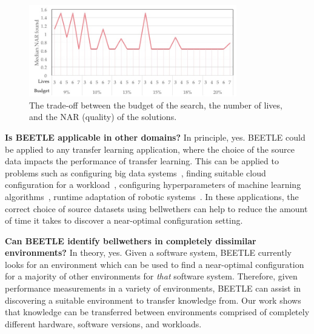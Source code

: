 \documentclass[10pt,journal,compsoc]{IEEEtran}
\begin{document}



\begin{figure}[t]
    \centering
    \includegraphics[width=0.98\linewidth, height=4cm]{figures/ParamTuning.jpg}
    \caption{The trade-off between the budget of the search, the number of lives, and the NAR (quality) of the solutions.}
    \label{fig:tuning}
\end{figure}


\noindent\textbf{Is BEETLE applicable in other domains?} In principle, yes. BEETLE could be applied to any transfer learning application, where the choice of the source data impacts the performance of transfer learning. This can be applied to problems such as configuring big data systems~\cite{JC:MASCOTS16}, finding suitable cloud configuration for a workload~\cite{Hsu2018scout, hsu2017low}, 
configuring hyperparameters of machine learning algorithms~\cite{fu2016tuning, fu2016differential, afridi2018}, runtime adaptation of robotic systems~\cite{jamshidi2017transfer}. In these applications, the correct choice of source datasets using bellwethers can help to reduce the amount of time it takes to discover a near-optimal configuration setting.

\noindent\textbf{Can BEETLE identify bellwethers in completely dissimilar environments?}
In theory, yes. Given a software system, BEETLE currently looks for an environment which can be used to find a near-optimal configuration for a majority of other environments for \textit{that} software system. Therefore, given performance measurements in a variety of environments, BEETLE can assist in discovering a suitable environment to transfer knowledge from. Our work shows that knowledge can be transferred between environments comprised of completely different hardware, software versions, and workloads.
\end{document}
